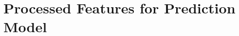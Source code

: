 \documentclass[format=acmsmall, review=false]{acmart}
\newcommand{\OPT}{\mathsf{OPT}}
\newcommand{\cP}{\mathcal{P}}
\begin{document}

\section{Processed Features for Prediction Model} \label{sec:practical_method}
\end{document}
